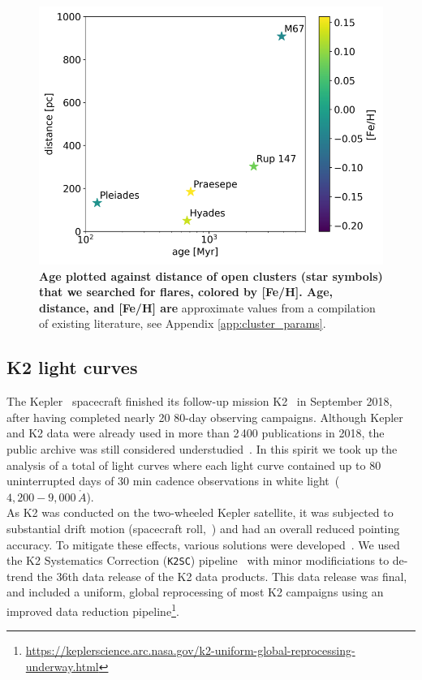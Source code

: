 \documentclass{aa}
\begin{document}
     \begin{figure}[ht!]
            \includegraphics[width=\hsize]{pics/clusters/openclusters_logage_vs_distance.png}
         \caption{\textbf{Age plotted against distance of open clusters (star symbols) that we searched for flares, colored by [Fe/H]. Age, distance, and [Fe/H] are }approximate values from a compilation of existing literature, see Appendix \ref{app:cluster_params}.}
         \label{fig:OCs}
   \end{figure}

\subsection{K2 light curves}
The Kepler~\citep{koch2010} spacecraft finished its follow-up mission K2~\citep{howell_k2_2014} in September 2018, after having completed nearly 20 80-day observing campaigns. Although Kepler and K2 data were already used in more than 2\,400 publications in 2018, the public archive was still considered understudied~\citep{barentsen_retirement_opportunities_2018}. In this spirit we took up the analysis of a total of light curves where each light curve contained up to $80$ uninterrupted days of $30$ min cadence observations in white light~($4,200-9,000\,\mathring{A}$).
\\
As K2 was conducted on the two-wheeled Kepler satellite, it was subjected to substantial drift motion (spacecraft roll,~\citealt{van_cleve_thats_2016}) and had an overall reduced pointing accuracy. To mitigate these effects, various solutions were developed~\citep{vanderburg_k2sff_2014, aigrain_k2sc_2016, luger_everest_2016, luger_everst_2018}. We used the K2 Systematics Correction (\texttt{K2SC}) pipeline~\citep{aigrain_k2sc_2016} with minor modificiations to de-trend the 36th data release of the K2 data products. This data release was final, and included a uniform, global reprocessing of most K2 campaigns using an improved data reduction pipeline\footnote{\url{https://keplerscience.arc.nasa.gov/k2-uniform-global-reprocessing-underway.html}}.
\end{document}

